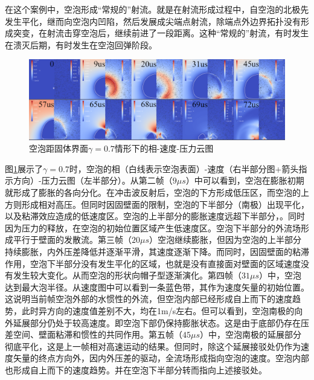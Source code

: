 在这个案例中，空泡形成“常规的”射流。就是在射流形成过程中，自空泡的北极先发生平化，继而向空泡内凹陷，然后发展成尖端点射流，除端点外边界拓扑没有形成突变，在射流击穿空泡后，继续前进了一段距离。这种“常规的”射流，有时发生在溃灭后期，有时发生在空泡回弹阶段。


\begin{figure}[h]
    \centering
    \includegraphics[width=0.9\linewidth]{img/3.solid0.7.png}
    \caption{空泡距固体界面$\gamma=0.7$情形下的相-速度-压力云图}
    \label{fig3.gamma0.7}
\end{figure}

图\ref{fig3.gamma0.7}展示了$\gamma=0.7$时，空泡的相（白线表示空泡表面）-速度（右半部分图+箭头指示方向）-压力云图（左半部分）。从第二帧（$9\mu s$）中可以看到，空泡在膨胀初期就形成了膨胀的各向分化。在冲击波反射后，空泡的下方形成低压区，而空泡的上方则形成相对高压。但同时因固壁面的限制，空泡的下半部分（南极）出现平化，以及粘滞效应造成的低速度区。空泡的上半部分的膨胀速度远超下半部分，。同时因为压力的释放，在空泡的初始位置区域产生低速度区。空泡下半部分的外流场形成平行于壁面的发散流。第三帧（$20\mu s$）空泡继续膨胀，但因为空泡的上半部分持续膨胀，内外压差降低并逐渐平滑，其速度逐渐下降。而同时，因固壁面的粘滞作用，空泡下半部分没有发生平化的区域，也就是没有直接面对壁面的区域速度没有发生较大变化。从而空泡的形状向帽子型逐渐演化。第四帧（$31\mu s$）中，空泡达到最大泡半径。从速度图中可以看到一条蓝色带，其作为速度矢量的初始位置。这说明当前帧空泡外部的水惯性的外流，但空泡内部已经形成自上而下的速度趋势，此时异方向的速度值差别不大，均在1m/s左右。但可以看到，空泡南极的向外延展部分仍处于较高速度。即空泡下部仍保持膨胀状态。这是由于底部仍存在压差空间、壁面粘滞和惯性的共同作用。第五帧（$45\mu s$）中，空泡南极的延展部分彻底平化，这是上一帧相对高速运动的结果。但同时，除这个延展接驳处仍作为速度矢量的终点方向外，因内外压差的驱动，全流场形成指向空泡的速度。空泡内部也形成自上而下的速度趋势。并在空泡下半部分转而指向上述接驳处。

